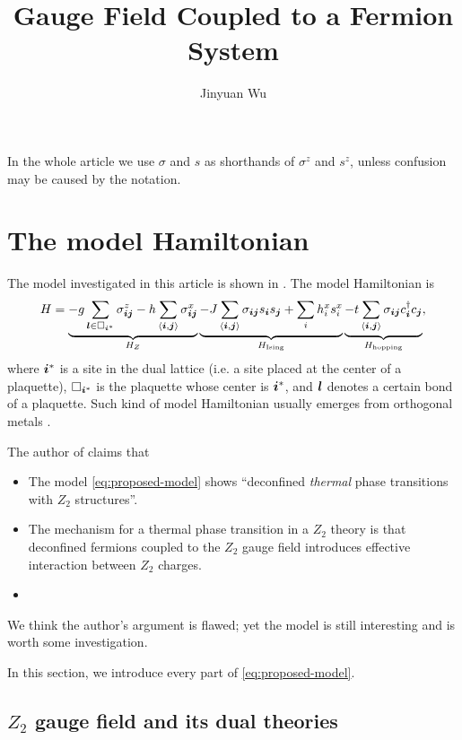 \documentclass[hyperref, a4paper]{article}
\title{\Ztwo Gauge Field Coupled to a Fermion System}
\author{Jinyuan Wu}
\newcommand*{\pair}[1]{\langle #1 \rangle}
\newcommand*{\Ztwo}{\texorpdfstring{$\mathbb{Z}_2$ }{Z2 }}
\def\mathbb#1{#1}%
\begin{document}
\maketitle

In the whole article we use $\sigma$ and $s$ as shorthands of $\sigma^z$ and $s^z$, unless confusion may be caused by the notation.

\section{The model Hamiltonian}

The model investigated in this article is shown in \cite{moon2019deconfined}.
The model Hamiltonian is 
\begin{equation}
    H = \underbrace{- g \sum_{\vb*{l} \in \Box_{\vb*{i}^*}} \sigma_{\vb*{i} \vb*{j}}^z - h \sum_{\pair{\vb*{i}, \vb*{j}}} \sigma^x_{\vb*{i} \vb*{j}}}_{H_Z} \underbrace{- J \sum_{\pair{\vb*{i}, \vb*{j}}} \sigma_{\vb*{i} \vb*{j}} s_{\vb*{i}} s_{\vb*{j}} + \sum_i h^x_i s^x_i}_{H_\text{Ising}} \underbrace{- t \sum_{\pair{\vb*{i}, \vb*{j}}} \sigma_{\vb*{i} \vb*{j}} c^\dagger_{\vb*{i}} c_{\vb*{j}}}_{H_\text{hopping}},
    \label{eq:proposed-model}
\end{equation}
where $\vb*{i}^*$ is a site in the dual lattice (i.e. a site placed at the center of a plaquette), 
$\Box_{\vb*{i}^*}$ is the plaquette whose center is $\vb*{i}^*$, and $\vb*{l}$ denotes a certain bond of a plaquette.
Such kind of model Hamiltonian usually emerges from orthogonal metals \cite{moon2019deconfined, orthogonal_metal}.

The author of \cite{moon2019deconfined} claims that 
\begin{itemize}
    \item The model \eqref{eq:proposed-model} shows ``deconfined \emph{thermal} phase transitions with \Ztwo structures''. 
    \item The mechanism for a thermal phase transition in a \Ztwo theory is that deconfined fermions coupled to the \Ztwo gauge field introduces effective interaction between \Ztwo charges.
    \item %
\end{itemize}
We think the author's argument is flawed; yet the model is still interesting and is worth some investigation.

In this section, we introduce every part of \eqref{eq:proposed-model}.

\subsection{\Ztwo gauge field and its dual theories}
\end{document}
